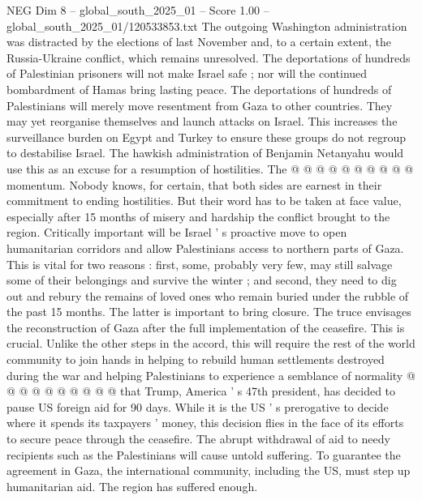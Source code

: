 \begin{textsample}{NEG Dim 8 – global\_south\_2025\_01 – Score 1.00 – global\_south\_2025\_01/120533853.txt}
The outgoing Washington administration was distracted by the elections of last November and, to a certain extent, the Russia-Ukraine conflict, which remains unresolved.
The deportations of hundreds of Palestinian prisoners will not make Israel safe ; nor will the continued bombardment of Hamas bring lasting peace.
The deportations of hundreds of Palestinians will merely move resentment from Gaza to other countries.
They may yet reorganise themselves and launch attacks on Israel.
This increases the surveillance burden on Egypt and Turkey to ensure these groups do not regroup to destabilise Israel.
The hawkish administration of Benjamin Netanyahu would use this as an excuse for a resumption of hostilities.
The @ @ @ @ @ @ @ @ @ @ momentum.
Nobody knows, for certain, that both sides are earnest in their commitment to ending hostilities.
But their word has to be taken at face value, especially after 15 months of misery and hardship the conflict brought to the region.
Critically important will be Israel ' s proactive move to open humanitarian corridors and allow Palestinians access to northern parts of Gaza.
This is vital for two reasons : first, some, probably very few, may still salvage some of their belongings and survive the winter ; and second, they need to dig out and rebury the remains of loved ones who remain buried under the rubble of the past 15 months.
The latter is important to bring closure.
The truce envisages the reconstruction of Gaza after the full implementation of the ceasefire.
This is crucial.
Unlike the other steps in the accord, this will require the rest of the world community to join hands in helping to rebuild human settlements destroyed during the war and helping Palestinians to experience a semblance of normality @ @ @ @ @ @ @ @ @ @ that Trump, America ' s 47th president, has decided to pause US foreign aid for 90 days.
While it is the US ' s prerogative to decide where it spends its taxpayers ' money, this decision flies in the face of its efforts to secure peace through the ceasefire.
The abrupt withdrawal of aid to needy recipients such as the Palestinians will cause untold suffering.
To guarantee the agreement in Gaza, the international community, including the US, must step up humanitarian aid.
The region has suffered enough.

\end{textsample}
